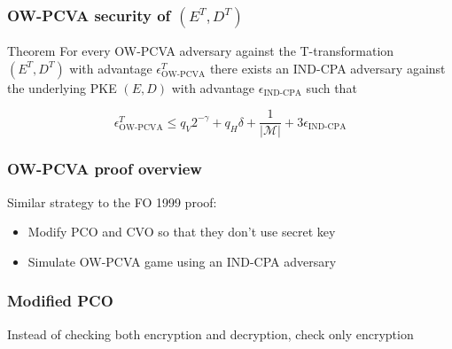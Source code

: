 \documentclass{beamer}
\begin{document}
\begin{frame}
    \frametitle{OW-PCVA security of $(E^T, D^T)$}

    \begin{alertblock}{Theorem}
        For every OW-PCVA adversary against the T-transformation $(E^T, D^T)$ with advantage $\epsilon^T_\text{OW-PCVA}$ there exists an IND-CPA adversary against the underlying PKE $(E, D)$ with advantage $\epsilon_\text{IND-CPA}$ such that

        \begin{equation*}
            \epsilon^T_\text{OW-PCVA} 
            \leq q_V2^{-\gamma}
            + q_H\delta
            + \frac{1}{\vert\mathcal{M}\vert} 
            + 3\epsilon_\text{IND-CPA}
        \end{equation*}
    \end{alertblock}
\end{frame}

\begin{frame}
    \frametitle{OW-PCVA proof overview}
    Similar strategy to the FO 1999 proof:
    \begin{itemize}
        \item Modify PCO and CVO so that they don't use secret key
        \item Simulate OW-PCVA game using an IND-CPA adversary
    \end{itemize}
\end{frame}

\begin{frame}
    \frametitle{Modified PCO}

    Instead of checking both encryption and decryption, check only encryption

    \begin{columns}
        \begin{algorithm}[H]
            \SetAlgoLined
            \caption{$\mathcal{O}^\text{PCO}$}
            \;
        \end{algorithm}

        \begin{algorithm}[H]
            \SetAlgoLined
            \caption{$\mathcal{O}^\text{PCO}_1$}
            \;
        \end{algorithm}
    \end{columns}
\end{frame}
\end{document}
